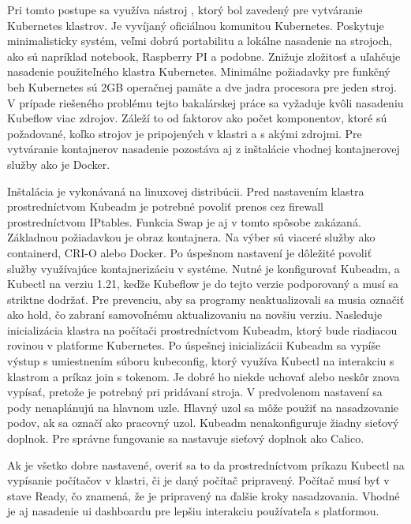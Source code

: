 Pri tomto postupe sa využíva nástroj , ktorý bol zavedený pre vytváranie Kubernetes klastrov. Je vyvíjaný oficiálnou komunitou Kubernetes. Poskytuje minimalisticky systém, veľmi dobrú portabilitu a lokálne nasadenie na strojoch, ako sú napríklad notebook, Raspberry PI a podobne. Znižuje zložitosť a uľahčuje nasadenie použiteľného klastra Kubernetes. Minimálne požiadavky pre funkčný beh Kubernetes sú 2GB operačnej pamäte a dve jadra procesora pre jeden stroj. V prípade riešeného problému tejto bakalárskej práce sa vyžaduje kvôli nasadeniu Kubeflow viac zdrojov. Záleží to od faktorov ako počet komponentov, ktoré sú požadované, koľko strojov je pripojených v klastri a s akými zdrojmi. Pre vytváranie kontajnerov nasadenie pozostáva aj z inštalácie vhodnej kontajnerovej služby ako je Docker.

Inštalácia je vykonávaná na linuxovej distribúcii. Pred nastavením klastra prostredníctvom Kubeadm je potrebné povoliť prenos cez firewall prostredníctvom IPtables. Funkcia Swap je aj v tomto spôsobe zakázaná. Základnou požiadavkou je obraz kontajnera. Na výber sú viaceré služby ako containerd, CRI-O alebo Docker. Po úspešnom nastavení je dôležité povoliť služby využívajúce kontajnerizáciu v systéme. Nutné je konfigurovať Kubeadm,  a Kubectl na verziu 1.21, keďže Kubeflow je do tejto verzie podporovaný a musí sa striktne dodržať. Pre prevenciu, aby sa programy neaktualizovali sa musia označiť ako hold, čo zabraní samovoľnému aktualizovaniu na novšiu verziu. Nasleduje inicializácia klastra na počítači prostredníctvom Kubeadm, ktorý bude riadiacou rovinou v platforme Kubernetes. Po úspešnej inicializácii Kubeadm sa vypíše výstup s umiestnením súboru kubeconfig, ktorý využíva Kubectl na interakciu s klastrom a príkaz join s tokenom. Je dobré ho niekde uchovať alebo neskôr znova vypísať, pretože je potrebný pri pridávaní stroja. V predvolenom nastavení sa pody nenaplánujú na hlavnom uzle. Hlavný uzol sa môže použiť na nasadzovanie podov, ak sa označí ako pracovný uzol. Kubeadm nenakonfiguruje žiadny sieťový doplnok. Pre správne fungovanie sa nastavuje sieťový doplnok ako Calico.

Ak je všetko dobre nastavené, overiť sa to da prostredníctvom príkazu Kubectl na vypísanie počítačov v klastri, či je daný počítač pripravený. Počítač musí byť v stave Ready, čo znamená, že je pripravený na ďalšie kroky nasadzovania. Vhodné je aj nasadenie \acrshort{ui} dashboardu pre lepšiu interakciu používateľa s platformou.

